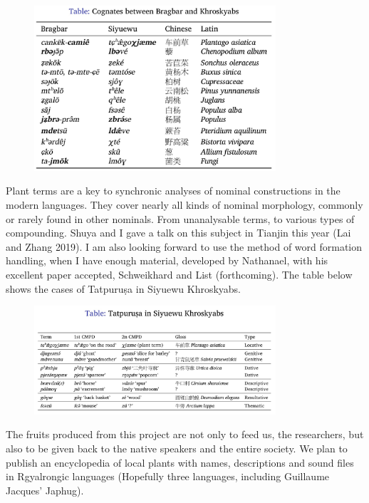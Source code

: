 \documentclass[
  a4paper,
  14pt,
  oneside,
  tablecaptionabove
]{scrbook}
\begin{document}
\begin{figure}[h!]
\centering
\includegraphics[width=0.8\textwidth]{images/2691575731829_.pic_hd.jpg}
\captionsetup{labelformat=empty}
\end{figure}


Plant terms are a key to synchronic analyses of nominal constructions in
the modern languages. They cover nearly all kinds of nominal morphology,
commonly or rarely found in other nominals. From unanalysable terms, to
various types of compounding. Shuya and I gave a talk on this subject in
Tianjin this year (Lai and Zhang 2019). I am also looking forward to use
the method of word formation handling, when I have enough material,
developed by Nathanael, with his excellent paper accepted, Schweikhard
and List (forthcoming). The table below shows the cases of Tatpuruṣa in
Siyuewu Khroskyabs.

\begin{figure}[h!]
\centering
\includegraphics[width=0.8\textwidth]{images/2701575731864_.pic_hd.jpg}
\captionsetup{labelformat=empty}
\end{figure}


The fruits produced from this project are not only to feed us, the
researchers, but also to be given back to the native speakers and the
entire society. We plan to publish an encyclopedia of local plants with
names, descriptions and sound files in Rgyalrongic languages (Hopefully
three languages, including Guillaume Jacques' Japhug).
\end{document}
